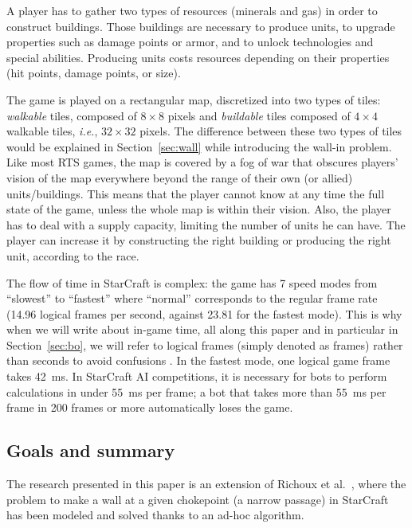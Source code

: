 \documentclass[journal]{IEEEtran}
\newcommand{\minormod}[1]{#1 \xspace}
\newcommand{\ie}{\textit{i.e.}}
\begin{document}
A player  has to  gather two  types of resources (minerals and  gas) in
order   to  construct   buildings. Those buildings are necessary to produce  units, to  upgrade
properties such as damage points or armor, and to unlock technologies
and special abilities. Producing units costs resources depending on their properties (hit points, damage points, or size).

The game  is played on  a rectangular map,  discretized into two  types of
tiles: \emph{walkable}  tiles, composed of  $8 \times  8$ pixels and  \emph{buildable} tiles
composed of $4  \times 4$ walkable tiles, \ie, $32  \times 32$ pixels. The
difference  between these  two types  of tiles  would be  explained in
Section~\ref{sec:wall}  while introducing  the wall-in  problem. Like
most RTS games, the map is covered by 
a fog of war that obscures players’ vision of the map everywhere beyond the range of their
own (or allied) units/buildings.
This means that the player cannot know at any
time the full state of the game, unless the whole map is within their vision.   Also, the player has to deal with a supply capacity, limiting the number of  units he can have. The player
can increase  it by constructing  the right building or  producing the
right unit, according to the race.

The flow of time in StarCraft is complex:  the game has 7  speed modes from
``slowest'' to ``fastest'' where ``normal'' corresponds to the regular
 frame rate  (14.96 logical frames per second, against 23.81 for the fastest mode). This is why when we will  write about in-game time, all along this
paper \minormod{and in particular in Section~\ref{sec:bo}, we will refer to logical frames (simply denoted as frames) rather than
seconds to avoid confusions}. 
In the fastest mode, one logical game  frame takes 42~ms. In StarCraft AI  competitions, 
it is necessary for bots to perform calculations in under 55~ms per frame;
a bot that takes more than 55~ms per frame in 200 frames or more automatically loses
the game.

\subsection{Goals and summary}

The research  presented in this  paper is  an extension of  Richoux et
al.~\cite{RichouxUO14}, where  the problem to  make a wall at  a given
chokepoint (a narrow passage) in StarCraft  has been  modeled  and solved  thanks to  an
ad-hoc algorithm.
\end{document}
